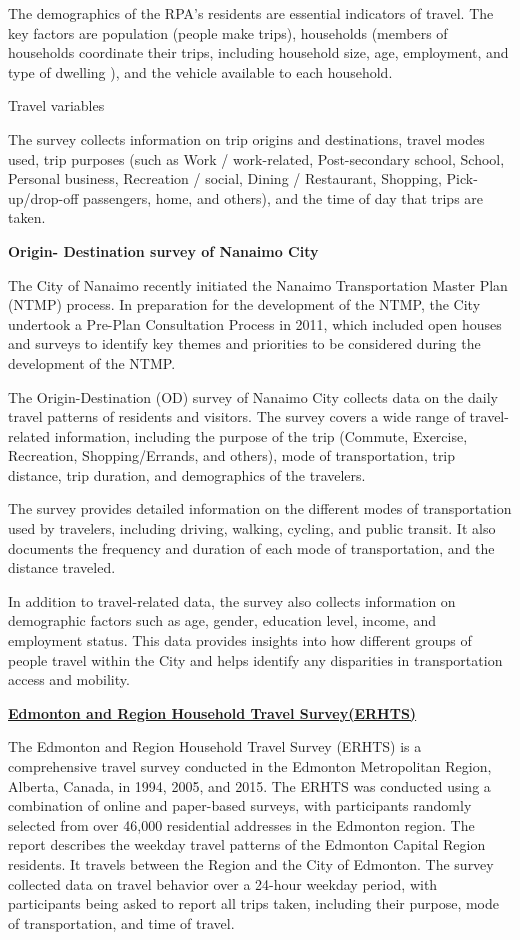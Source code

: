 \documentclass[12pt,twoside]{reedthesis}
\begin{document}
The demographics of the RPA's residents are essential indicators of travel. The key factors are population (people make trips), households (members of households coordinate their trips, including household size, age, employment, and type of dwelling ), and the vehicle available to each household.

Travel variables

The survey collects information on trip origins and destinations, travel modes used, trip purposes (such as Work / work-related, Post-secondary school, School, Personal business, Recreation / social, Dining / Restaurant, Shopping, Pick-up/drop-off passengers, home, and others), and the time of day that trips are taken.

\textbf{Origin- Destination survey of Nanaimo City}

The City of Nanaimo recently initiated the Nanaimo Transportation Master Plan (NTMP) process. In preparation for the development of the NTMP, the City undertook a Pre-Plan Consultation Process in 2011, which included open houses and surveys to identify key themes and priorities to be considered during the development of the NTMP.

The Origin-Destination (OD) survey of Nanaimo City collects data on the daily travel patterns of residents and visitors. The survey covers a wide range of travel-related information, including the purpose of the trip (Commute, Exercise, Recreation, Shopping/Errands, and others), mode of transportation, trip distance, trip duration, and demographics of the travelers.

The survey provides detailed information on the different modes of transportation used by travelers, including driving, walking, cycling, and public transit. It also documents the frequency and duration of each mode of transportation, and the distance traveled.

In addition to travel-related data, the survey also collects information on demographic factors such as age, gender, education level, income, and employment status. This data provides insights into how different groups of people travel within the City and helps identify any disparities in transportation access and mobility.

\textbf{\href{https://www.edmonton.ca/transportation/traffic_reports/travel-pattern-analysis}{Edmonton and Region Household Travel Survey(ERHTS)}}

The Edmonton and Region Household Travel Survey (ERHTS) is a comprehensive travel survey conducted in the Edmonton Metropolitan Region, Alberta, Canada, in 1994, 2005, and 2015. The ERHTS was conducted using a combination of online and paper-based surveys, with participants randomly selected from over 46,000 residential addresses in the Edmonton region. The report describes the weekday travel patterns of the Edmonton Capital Region residents. It travels between the Region and the City of Edmonton. The survey collected data on travel behavior over a 24-hour weekday period, with participants being asked to report all trips taken, including their purpose, mode of transportation, and time of travel.
\end{document}
